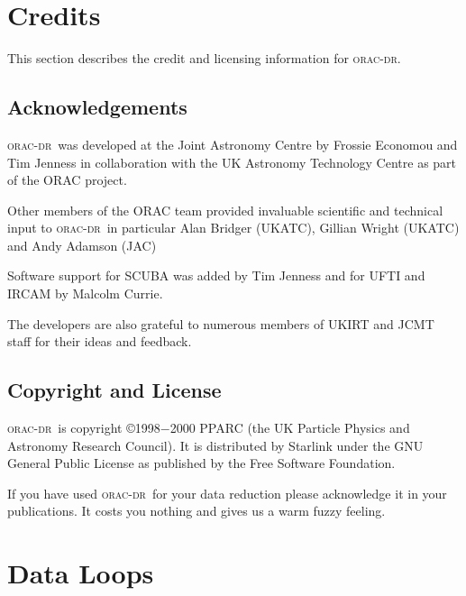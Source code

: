 \documentclass[twoside,11pt]{article}
\newcommand{\xlabel}[1]{}
\renewcommand{\_}{\texttt{\symbol{95}}}
\def\C++{{\rm C\kern-.05em\raise.3ex\hbox{\footnotesize ++}}}
\newcommand{\underscore}{\_}
\newcommand{\oracdr}{\textsc{orac-dr}}
\begin{document}
\section{Credits\xlabel{credits}}

This section describes the credit and licensing information for \oracdr.

\subsection*{Acknowledgements}

\oracdr\ was developed at the Joint Astronomy Centre by
Frossie Economou and Tim Jenness in collaboration with the UK Astronomy Technology Centre as part of the ORAC project. 

Other members of the ORAC team provided invaluable scientific 
and technical input to \oracdr\, in particular Alan Bridger (UKATC),
Gillian Wright (UKATC) and Andy Adamson (JAC)

Software support for SCUBA was added by Tim Jenness
and for UFTI and IRCAM by Malcolm Currie.

The developers are also grateful to numerous members of
UKIRT and JCMT staff for their ideas and feedback.

\subsection*{Copyright and License}

\oracdr\ is copyright \copyright 1998$-$2000 PPARC (the UK Particle Physics and Astronomy
Research Council). It is distributed by Starlink under the
GNU General Public License as published by the Free Software Foundation.

If you have used \oracdr\ for your data reduction please acknowledge it
in your publications. It costs you nothing and gives us a warm fuzzy
feeling.

\appendix



\section{Data Loops\xlabel{data_loops}}
\end{document}
